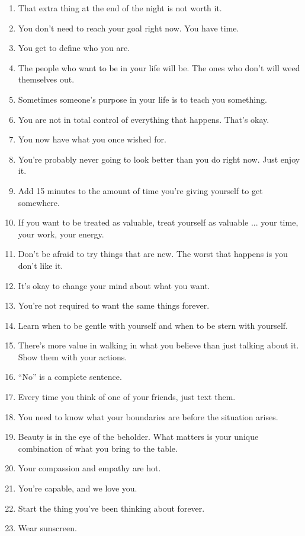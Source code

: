 \documentclass[12pt, letterpaper]{article}
\begin{document}
\begin{enumerate}[leftmargin=*, label=\arabic*.]
  \item That extra thing at the end of the night is not worth it.
  \item You don't need to reach your goal right now. You have time.
  \item You get to define who you are.
  \item The people who want to be in your life will be. The ones who don't will weed themselves out.
  \item Sometimes someone's purpose in your life is to teach you something.
  \item You are not in total control of everything that happens. That's okay.
  \item You now have what you once wished for.
  \item You're probably never going to look better than you do right now. Just enjoy it.
  \item Add 15 minutes to the amount of time you're giving yourself to get somewhere.
  \item If you want to be treated as valuable, treat yourself as valuable ... your time, your work, your energy.
  \item Don't be afraid to try things that are new. The worst that happens is you don't like it.
  \item It's okay to change your mind about what you want.
  \item You're not required to want the same things forever.
  \item Learn when to be gentle with yourself and when to be stern with yourself.
  \item There's more value in walking in what you believe than just talking about it. Show them with your actions.
  \item ``No'' is a complete sentence.
  \item Every time you think of one of your friends, just text them.
  \item You need to know what your boundaries are before the situation arises.
  \item Beauty is in the eye of the beholder. What matters is your unique combination of what you bring to the table.
  \item Your compassion and empathy are hot.
  \item You're capable, and we love you.
  \item Start the thing you've been thinking about forever.
  \item Wear sunscreen.
\end{enumerate}
\end{document}
